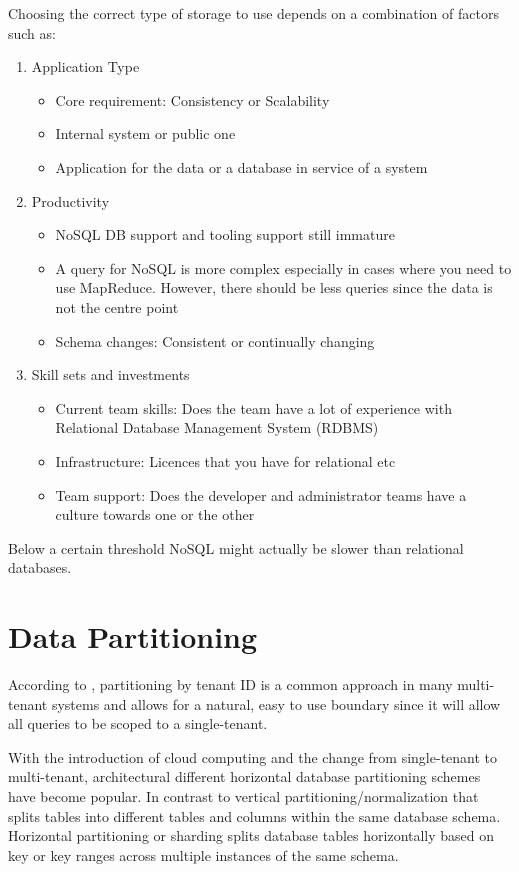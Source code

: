 Choosing the correct type of storage to use depends on a combination of factors such as:
 

\begin{enumerate}
\item Application Type
\begin{itemize}
    \item Core requirement: Consistency or Scalability
    \item Internal system or public one
    \item Application for the data or a database in service of a system
\end{itemize}
\item Productivity
\begin{itemize}
    \item NoSQL DB support and tooling support still immature
    \item A query for NoSQL is more complex especially in cases where you           need to use MapReduce. However, there should be less queries              since the data is not the centre point
    \item Schema changes: Consistent or continually changing
\end{itemize}
\item Skill sets and investments
\begin{itemize}
    \item Current team skills: Does the team have a lot of experience with           Relational Database Management System (RDBMS)
    \item Infrastructure: Licences that you have for relational etc
    \item Team support: Does the developer and administrator teams have a           culture towards one or the other
\end{itemize}
\end{enumerate}

Below a certain threshold NoSQL might actually be slower than relational databases.

\section{Data Partitioning}

According to \cite{Betts2012-ad}, partitioning by tenant ID is a common approach in many multi-tenant systems and allows for a natural, easy to use boundary since it will allow all queries to be scoped to a single-tenant.
 
With the introduction of cloud computing and the change from single-tenant to multi-tenant, architectural different horizontal database partitioning schemes have become popular. In contrast to vertical partitioning/normalization that splits tables into different tables and columns within the same database schema. Horizontal partitioning or sharding splits database tables horizontally based on key or key ranges across multiple instances of the same schema.
 
